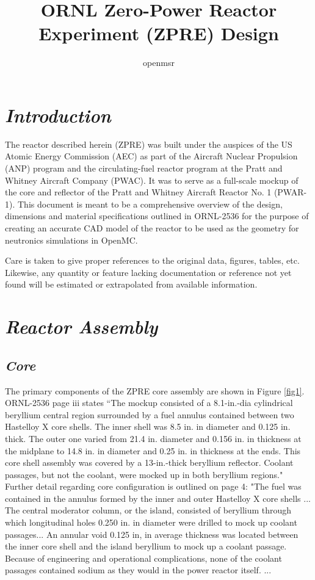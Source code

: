 \documentclass[ms,a4paper]{memoir}
\title{ORNL Zero-Power Reactor Experiment (ZPRE) Design}
\author{openmsr}
\date{}
\begin{document}
\maketitle

\vspace{-4cm}
\renewcommand{\contentsname}{contents}
\tableofcontents*

\section{\emph{Introduction}}

The reactor described herein (ZPRE) was built under the auspices of the US Atomic Energy Commission (AEC) as part of the Aircraft Nuclear Propulsion (ANP) program and the circulating-fuel reactor program at the Pratt and Whitney Aircraft Company (PWAC). It was to serve as a full-scale mockup of the core and reflector of the Pratt and Whitney Aircraft Reactor No. 1 (PWAR-1). This document is meant to be a comprehensive overview of the design, dimensions and material specifications outlined in ORNL-2536 for the purpose of creating an accurate CAD model of the reactor to be used as the geometry for neutronics simulations in OpenMC.

Care is taken to give proper references to the original data, figures, tables, etc. Likewise, any quantity or feature  lacking documentation or reference not yet found will be estimated or extrapolated from available information.

\section{\emph{Reactor Assembly}}

\subsection{\emph{Core}}

The primary components of the ZPRE core assembly are shown in Figure \ref{fig1}. ORNL-2536 page iii states “The mockup consisted of a 8.1-in.-dia cylindrical beryllium central region surrounded by a fuel annulus contained between two Hastelloy X core shells. The inner shell was 8.5 in. in diameter and 0.125 in. thick. The outer one varied from 21.4 in. diameter and 0.156 in. in thickness at the midplane to 14.8 in. in diameter and 0.25 in. in thickness at the ends. This core shell assembly was covered by a 13-in.-thick beryllium reflector. Coolant passages, but not the coolant, were mocked up in both beryllium regions." Further detail regarding core configuration is outlined on page 4: "The fuel was contained in the annulus formed by the inner and outer Hastelloy X core shells ... The central moderator column, or the island, consisted of beryllium through which longitudinal holes 0.250 in. in diameter were drilled to mock up coolant passages... An annular void 0.125 in, in average thickness was located between the inner core shell and the island beryllium to mock up a coolant passage. Because of engineering and operational complications, none of the coolant passages contained sodium as they would in the power reactor itself. ...
\end{document}
